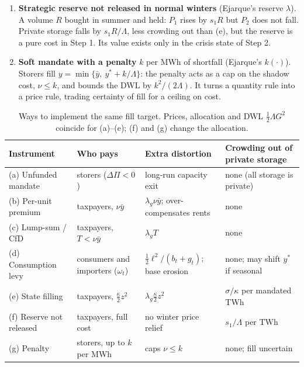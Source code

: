\documentclass[11pt]{article}
\theoremstyle{definition}
\newcommand{\ybar}{\bar y}
\begin{document}
\begin{enumerate}[label=(\alph*)]
\item \textbf{Strategic reserve not released in normal winters} (Ejarque's reserve $\lambda$). A volume $R$
bought in summer and held: $P_1$ rises by $s_1R$ but $P_2$ does not fall. Private storage falls by
$s_1R/\Lambda$, less crowding out than (e), but the reserve is a pure cost in Step 1. Its value exists only in the
crisis state of Step 2.

\item \textbf{Soft mandate with a penalty} $k$ per MWh of shortfall (Ejarque's $k(\cdot)$). Storers fill
$y=\min\{\ybar,\ y^*+k/\Lambda\}$: the penalty acts as a cap on the shadow cost, $\nu\le k$, and bounds the DWL by
$k^2/(2\Lambda)$. It turns a quantity rule into a price rule, trading certainty of fill for a ceiling on cost.
\end{enumerate}

\begin{table}[ht]
\centering\small
\begin{tabularx}{\textwidth}{l>{\raggedright\arraybackslash}X>{\raggedright\arraybackslash}X>{\raggedright\arraybackslash}X}
\toprule
Instrument & Who pays & Extra distortion & Crowding out of private storage\\
\midrule
(a) Unfunded mandate & storers ($\Delta\Pi<0$) & long-run capacity exit & none (all storage is private)\\
(b) Per-unit premium & taxpayers, $\nu\ybar$ & $\lambda_g\nu\ybar$; over-compensates rents & none\\
(c) Lump-sum / CfD & taxpayers, $T<\nu\ybar$ & $\lambda_gT$ & none\\
(d) Consumption levy & consumers and importers ($\omega_t$) & $\tfrac12\ell^2/(b_t+g_t)$; base erosion & none; may shift $y^*$ if seasonal\\
(e) State filling & taxpayers, $\tfrac\kappa2z^2$ & $\lambda_g\tfrac\kappa2z^2$ & $\sigma/\kappa$ per mandated TWh\\
(f) Reserve not released & taxpayers, full cost & no winter price relief & $s_1/\Lambda$ per TWh\\
(g) Penalty & storers, up to $k$ per MWh & caps $\nu\le k$ & none; fill uncertain\\
\bottomrule
\end{tabularx}
\caption{Ways to implement the same fill target. Prices, allocation and DWL $\tfrac12\Lambda G^2$ coincide for
(a)--(e); (f) and (g) change the allocation.}
\label{tab:financing}
\end{table}
\end{document}
